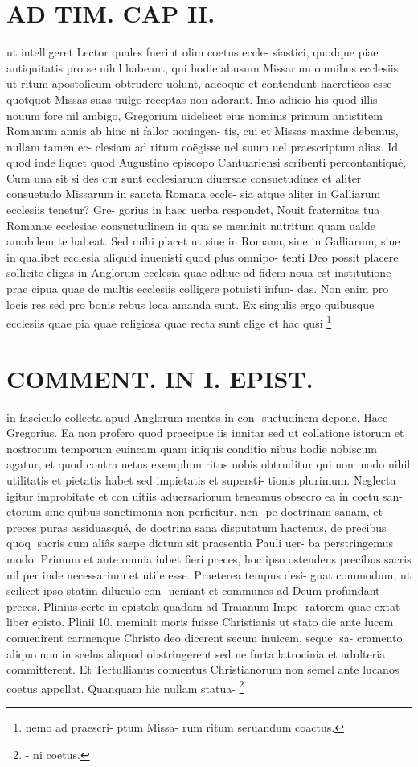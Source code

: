 \documentclass{article}
\begin{document}
\begin{pages}
\section*{AD TIM. CAP II. }
\marginpar{[ p.110 ]}\pstart ut intelligeret Lector quales fuerint olim coetus eccle- siastici, quodque piae antiquitatis pro se nihil habeant, qui hodie abusum Missarum omnibus ecclesiis ut ritum apostolicum obtrudere uolunt, adeoque et contendunt haereticos esse quotquot Missas suas uulgo receptas non adorant. Imo adiicio his quod illis nouum fore nil ambigo, Gregorium uidelicet eius nominis primum antistitem Romanum annis ab hinc ni fallor noningen- tis, cui et Missas maxime debemus, nullam tamen ec- clesiam ad ritum coëgisse uel suum uel praescriptum alias. Id quod inde liquet quod Augustino episcopo Cantuariensi scribenti percontantiqué, Cum una sit si des cur sunt ecclesiarum diuersae consuetudines et aliter consuetudo Missarum in sancta Romana eccle- sia atque aliter in Galliarum ecclesiis tenetur? Gre- gorius in haec uerba respondet, Nouit fraternitas tua Romanae ecclesiae consuetudinem in qua se meminit nutritum quam ualde amabilem te habeat. Sed mihi placet ut siue in Romana, siue in Galliarum, siue in qualibet ecclesia aliquid inuenisti quod plus omnipo- tenti Deo possit placere sollicite eligas in Anglorum ecclesia quae adhuc ad fidem noua est institutione prae cipua quae de multis ecclesiis colligere potuisti infun- das. Non enim pro locis res sed pro bonis rebus loca amanda sunt. Ex singulis ergo quibusque ecclesiis quae pia quae religiosa quae recta sunt elige et hac qusi  \pend\footnote{\footnotesizeOlim nemo ad praescri- ptum Missa- rum ritum seruandum coactus. }
\section*{COMMENT. IN I. EPIST. }\pstart in fasciculo collecta apud Anglorum mentes in con- suetudinem depone. Haec Gregorius. Ea non profero quod praecipue iis innitar sed ut collatione istorum et nostrorum temporum euincam quam iniquis conditio nibus hodie nobiscum agatur, et quod contra uetus exemplum ritus nobis obtruditur qui non modo nihil utilitatis et pietatis habet sed impietatis et supersti- tionis plurimum. Neglecta igitur improbitate et con uitiis aduersariorum teneamus obsecro ea in coetu san- ctorum sine quibus sanctimonia non perficitur, nen- pe doctrinam sanam, et preces puras assiduasqué, de doctrina sana disputatum hactenus, de precibus quoq sacris cum aliâs saepe dictum sit praesentia Pauli uer- ba perstringemus modo. Primum et ante omnia iubet fieri preces, hoc ipso ostendens precibus sacris nil per inde necessarium et utile esse. Praeterea tempus desi- gnat commodum, ut scilicet ipso statim diluculo con- ueniant et communes ad Deum profundant preces. Plinius certe in epistola quadam ad Traianum Impe- ratorem quae extat liber  episto. Plinii 10. meminit moris fuisse Christianis ut stato die ante lucem conuenirent carmenque Christo deo dicerent secum inuicem, seque sa- cramento aliquo non in scelus aliquod obstringerent sed ne furta latrocinia et adulteria committerent. Et Tertullianus conuentus Christianorum non semel ante lucanos coetus appellat. Quanquam hic nullam statua-  \pend\footnote{\footnotesizeAnteluca- ni coetus. }

\end{pages}
\end{document}
